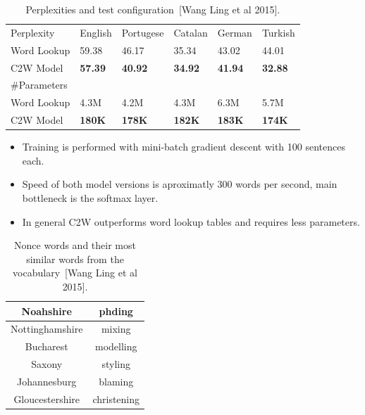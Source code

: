 \documentclass[11pt, a4paper, landscape]{article}
\begin{document}
\begin{table}
\centering
\begin{tabular}{ l | l l l l l }
  Perplexity   & English & Portugese & Catalan & German & Turkish \\
  Word Lookup  & 59.38   & 46.17     &   35.34 & 43.02  & 44.01   \\
  C2W Model    & \textbf{57.39}   & \textbf{40.92}     &   \textbf{34.92} & \textbf{41.94}  & \textbf{32.88}   \\
  \#Parameters  &         &           &         &        &         \\
  Word Lookup  & 4.3M    & 4.2M      &  4.3M   & 6.3M   & 5.7M   \\
  C2W Model    & \textbf{180K}    & \textbf{178K}      &  \textbf{182K}   & \textbf{183K}   & \textbf{174K}   \\

\end{tabular}
\caption{Perplexities and test configuration~{[}Wang Ling et al 2015{]}.}
\end{table}
\vfill
\begin{itemize}
\item Training is performed with mini-batch gradient descent with 100 sentences each.  
\item Speed of both model versions is aproximatly 300 words per second, main bottleneck is the softmax layer.
\item In general C2W outperforms word lookup tables and requires less parameters.
\end{itemize}
\vfill

\NewPage{}

\begin{table}
\centering
\begin{tabular}{ c | c }
   Noahshire &  phding \\ \hline
   Nottinghamshire & mixing \\
   Bucharest & modelling \\
   Saxony & styling \\
   Johannesburg & blaming \\
   Gloucestershire & christening \\
\end{tabular}
\caption{Nonce words and their most similar words from the vocabulary~{[}Wang Ling et al 2015{]}.}
\end{table}
\end{document}

